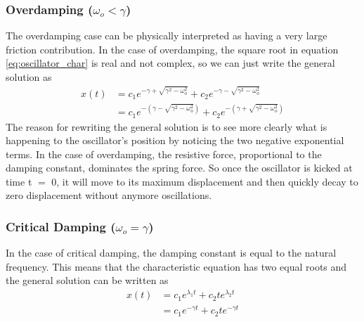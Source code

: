 \documentclass{article}
\newcommand{\be}{\begin{equation}}
\newcommand{\ee}{\end{equation}}
\begin{document}
\subsubsection*{Overdamping ($\omega_o < \gamma$)}
The overdamping case can be physically interpreted as having a very large friction contribution. 
In the case of overdamping, the square root in equation \ref{eq:oscillator_char} is real and not complex, so we can just write the general solution as
\be
\begin{split}
x(t) &= c_1 e^{-\gamma + \sqrt{\gamma^2 - \omega_o^2}} + c_2 e^{-\gamma - \sqrt{\gamma^2 - \omega_o^2}} \\
&= c_1 e^{-(\gamma - \sqrt{\gamma^2 - \omega_o^2})} + c_2 e^{-(\gamma + \sqrt{\gamma^2 - \omega_o^2})}
\end{split}
\ee
The reason for rewriting the general solution is to see more clearly what is happening to the oscillator's position by noticing the two negative exponential terms.
In the case of overdamping, the resistive force, proportional to the damping constant, dominates the spring force.
So once the oscillator is kicked at time t $=$ 0, it will move to its maximum displacement and then quickly decay to zero displacement without anymore oscillations.

\subsubsection*{Critical Damping ($\omega_o = \gamma$)}
In the case of critical damping, the damping constant is equal to the natural frequency.
This means that the characteristic equation has two equal roots and the general solution can be written as
\be
\begin{split}
x(t) &= c_1 e^{\lambda_1 t} + c_2 te^{\lambda_2 t}\\
&= c_1 e^{-\gamma t} + c_2 te^{-\gamma t}\\
\end{split}
\ee
\end{document}
